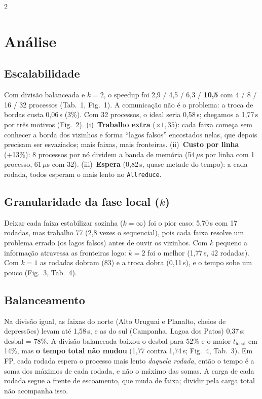 \documentclass[9pt,a4paper]{extarticle}
\newcommand{\tl}{t_{\mathrm{local}}}
\begin{document}
\begin{multicols}{2}
\section{Análise}
\subsection{Escalabilidade}
Com divisão balanceada e $k=2$, o speedup foi 2,9 / 4,5 / 6,3 / \textbf{10,5} com 4 / 8 / 16 / 32 processos (Tab.~1, Fig.~1). A comunicação não é o problema: a troca de bordas custa 0,06\,s (3\%). Com 32 processos, o ideal seria 0,58\,s; chegamos a 1,77\,s por três motivos (Fig.~2). (i)~\textbf{Trabalho extra} ($\times1{,}35$): cada faixa começa sem conhecer a borda dos vizinhos e forma ``lagos falsos'' encostados nelas, que depois precisam ser esvaziados; mais faixas, mais fronteiras. (ii)~\textbf{Custo por linha} (+13\%): 8 processos por nó dividem a banda de memória (54\,$\mu$s por linha com 1 processo, 61\,$\mu$s com 32). (iii)~\textbf{Espera} (0,82\,s, quase metade do tempo): a cada rodada, todos esperam o mais lento no \texttt{Allreduce}.

\subsection{Granularidade da fase local ($k$)}
Deixar cada faixa estabilizar sozinha ($k=\infty$) foi o pior caso: 5,70\,s com 17 rodadas, mas trabalho 77 (2,8 vezes o sequencial), pois cada faixa resolve um problema errado (os lagos falsos) antes de ouvir os vizinhos. Com $k$ pequeno a informação atravessa as fronteiras logo: $k=2$ foi o melhor (1,77\,s, 42 rodadas). Com $k=1$ as rodadas dobram (83) e a troca dobra (0,11\,s), e o tempo sobe um pouco (Fig.~3, Tab.~4).

\subsection{Balanceamento}
Na divisão igual, as faixas do norte (Alto Uruguai e Planalto, cheios de depressões) levam até 1,58\,s, e as do sul (Campanha, Lagoa dos Patos) 0,37\,s: desbal = 78\%. A divisão balanceada baixou o desbal para 52\% e o maior $\tl$ em 14\%, mas \textbf{o tempo total não mudou} (1,77 contra 1,74\,s; Fig.~4, Tab.~3). Em FP, cada rodada espera o processo mais lento \emph{daquela rodada}, então o tempo é a soma dos máximos de cada rodada, e não o máximo das somas. A carga de cada rodada segue a frente de escoamento, que muda de faixa; dividir pela carga total não acompanha isso.


\end{multicols}
\end{document}
